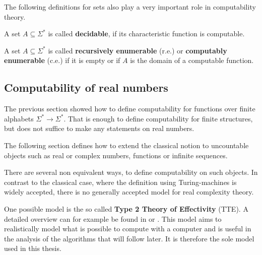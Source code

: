  The following definitions for sets also play a very important role in
 computability theory.
  \begin{definition}
A set $A \subseteq \Sigma^*$ is called \textbf{decidable}, if its characteristic function is computable.
\end{definition}
\begin{definition}
A set $A \subseteq \Sigma^*$ is called \textbf{recursively enumerable} (r.e.) or \textbf{computably enumerable} (c.e.) if
it is empty or if $A$ is the domain of a computable function.
\end{definition}
\subsection{Computability of real numbers}
The previous section showed how to define computability for functions over finite alphabets $\Sigma^* \to \Sigma^*$. 
That is enough to define computability for finite structures, but does not
suffice to make any statements on real numbers.

The following section defines how to extend the classical notion to uncountable
objects such as real or complex numbers, functions or infinite sequences.

There are several non equivalent ways, to define computability on such objects. 
In contrast to the classical case, where the definition using Turing-machines is widely accepted, there is no 
generally accepted model for real complexity theory.

One possible model is the so called \textbf{Type 2 Theory of Effectivity}
(TTE). A detailed overview can for example be found in \cite{Wei} or
\cite{Brattka2008a}.
This model aims to realistically model what is possible to compute with a
computer and is useful in the analysis of the algorithms that will follow
later.
It is therefore the sole model used in this thesis. 

